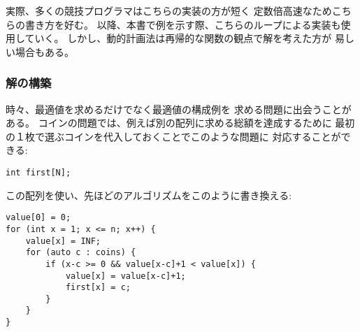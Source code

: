 \begin{comment}
In fact, most competitive programmers prefer this
implementation, because it is shorter and has
lower constant factors.
From now on, we also use iterative implementations
in our examples.
Still, it is often easier to think about
dynamic programming solutions
in terms of recursive functions.
\end{comment}

実際、多くの競技プログラマはこちらの実装の方が短く
定数倍高速なためこちらの書き方を好む。
以降、本書で例を示す際、こちらのループによる実装も使用していく。
しかし、動的計画法は再帰的な関数の観点で解を考えた方が
易しい場合もある。

\begin{comment}
\subsubsection{Constructing a solution}

Sometimes we are asked both to find the value
of an optimal solution and to give
an example how such a solution can be constructed.
In the coin problem, for example,
we can declare another array
that indicates for
each sum of money the first coin 
in an optimal solution:
\begin{lstlisting}
int first[N];
\end{lstlisting}
Then, we can modify the algorithm as follows:
\end{comment}

\subsubsection{解の構築}

時々、最適値を求めるだけでなく最適値の構成例を
求める問題に出会うことがある。
コインの問題では、例えば別の配列に求める総額を達成するために
最初の１枚で選ぶコインを代入しておくことでこのような問題に
対応することができる:
\begin{lstlisting}
int first[N];
\end{lstlisting}

この配列を使い、先ほどのアルゴリズムをこのように書き換える:
\begin{lstlisting}
value[0] = 0;
for (int x = 1; x <= n; x++) {
    value[x] = INF;
    for (auto c : coins) {
        if (x-c >= 0 && value[x-c]+1 < value[x]) {
            value[x] = value[x-c]+1;
            first[x] = c;
        }
    }
}
\end{lstlisting}

